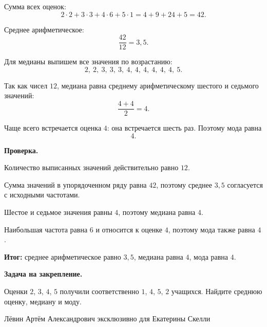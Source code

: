 \documentclass[12pt,a4paper]{article}
\begin{document}
Сумма всех оценок:
\[
2\cdot2+3\cdot3+4\cdot6+5\cdot1
=
4+9+24+5
=
42.
\]

Среднее арифметическое:
\[
\frac{42}{12}=3{,}5.
\]

Для медианы выпишем все значения по возрастанию:
\[
2,\ 2,\ 3,\ 3,\ 3,\ 4,\ 4,\ 4,\ 4,\ 4,\ 4,\ 5.
\]

Так как чисел $12$, медиана равна среднему арифметическому шестого и седьмого значений:
\[
\frac{4+4}{2}=4.
\]

Чаще всего встречается оценка $4$: она встречается шесть раз. Поэтому мода равна
\[
4.
\]

\textbf{Проверка.}

Количество выписанных значений действительно равно $12$.

Сумма значений в упорядоченном ряду равна $42$, поэтому среднее $3{,}5$ согласуется с исходными частотами.

Шестое и седьмое значения равны $4$, поэтому медиана равна $4$.

Наибольшая частота равна $6$ и относится к оценке $4$, поэтому мода также равна $4$.

\textcolor{teal!60!black}{\textbf{Итог:}} среднее арифметическое равно $3{,}5$, медиана равна $4$, мода равна $4$.

\textbf{Задача на закрепление.}

Оценки $2$, $3$, $4$, $5$ получили соответственно $1$, $4$, $5$, $2$ учащихся. Найдите среднюю оценку, медиану и моду.

\vfill
\begin{center}
\small Лёвин Артём Александрович эксклюзивно для Екатерины Скелли
\end{center}
\end{document}
